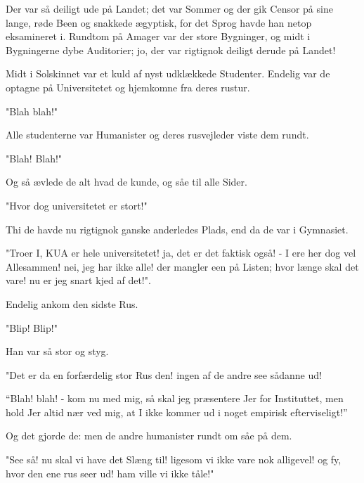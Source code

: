 \documentclass[a4paper,11pt]{article}
\begin{document}
  
\begin{sketch}
 Der var så deiligt ude på Landet; det var Sommer og der gik
Censor på sine lange, røde Been og snakkede ægyptisk, for det Sprog
havde han netop eksamineret i. Rundtom på Amager var der store
Bygninger, og midt i Bygningerne dybe Auditorier; jo, der var
rigtignok deiligt derude på Landet!

 Midt i Solskinnet var et kuld af nyst udklækkede Studenter. Endelig
var de optagne på Universitetet og hjemkomne fra deres rustur.

 "Blah blah!"

 Alle studenterne var Humanister og deres rusvejleder viste dem rundt.

 "Blah! Blah!"

 Og så ævlede de alt hvad de kunde, og såe til alle Sider.

 "Hvor dog universitetet er stort!"

 Thi de havde nu rigtignok ganske anderledes Plads, end da de var i Gymnasiet.

 "Troer I, KUA er hele universitetet! ja, det er det faktisk også! -
I ere her dog vel Allesammen! nei, jeg har ikke alle! der mangler een
på Listen; hvor længe skal det vare! nu er jeg snart kjed af det!".

 Endelig ankom den sidste Rus.

 "Blip! Blip!"

 Han var så stor og styg.

 "Det er da en forfærdelig stor Rus den! ingen af de andre see
sådanne ud! 



 ``Blah! blah! - kom nu med mig, så skal jeg præsentere
Jer for Instituttet, men hold Jer altid nær ved mig, at I ikke kommer
ud i noget empirisk efterviseligt!''

 Og det gjorde de: men de andre humanister rundt om såe på dem.

 "See så! nu skal vi have det Slæng til! ligesom vi ikke vare nok
alligevel! og fy, hvor den ene rus seer ud! ham ville vi ikke tåle!"


\end{sketch}
\end{document}
